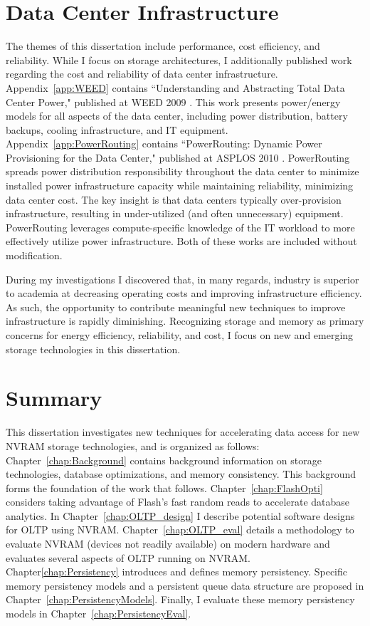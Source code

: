 \section{Data Center Infrastructure}
\label{sec:Intro:Additional}
The themes of this dissertation include performance, cost efficiency, and reliability.
While I focus on storage architectures, I additionally published work regarding the cost and reliability of data center infrastructure.
Appendix~\ref{app:WEED} contains ``Understanding and Abstracting Total Data Center Power," published at WEED 2009 \cite{PelleyMeisner09}.
This work presents power/energy models for all aspects of the data center, including power distribution, battery backups, cooling infrastructure, and IT equipment.
Appendix~\ref{app:PowerRouting} contains ``PowerRouting: Dynamic Power Provisioning for the Data Center," published at ASPLOS 2010 \cite{PelleyMeisner10}.
PowerRouting spreads power distribution responsibility throughout the data center to minimize installed power infrastructure capacity while maintaining reliability, minimizing data center cost.
The key insight is that data centers typically over-provision infrastructure, resulting in under-utilized (and often unnecessary) equipment.
PowerRouting leverages compute-specific knowledge of the IT workload to more effectively utilize power infrastructure.
Both of these works are included without modification.

During my investigations I discovered that, in many regards, industry is superior to academia at decreasing operating costs and improving infrastructure efficiency.
As such, the opportunity to contribute meaningful new techniques to improve infrastructure is rapidly diminishing.
Recognizing storage and memory as primary concerns for energy efficiency, reliability, and cost, I focus on new and emerging storage technologies in this dissertation.

\section{Summary}
\label{sec:Intro:Summary}
This dissertation investigates new techniques for accelerating data access for new NVRAM storage technologies, and is organized as follows:
Chapter~\ref{chap:Background} contains background information on storage technologies, database optimizations, and memory consistency.
This background forms the foundation of the work that follows.
Chapter~\ref{chap:FlashOpti} considers taking advantage of Flash's fast random reads to accelerate database analytics.
In Chapter~\ref{chap:OLTP_design} I describe potential software designs for OLTP using NVRAM.
Chapter~\ref{chap:OLTP_eval} details a methodology to evaluate NVRAM (devices not readily available) on modern hardware and evaluates several aspects of OLTP running on NVRAM.
Chapter\ref{chap:Persistency} introduces and defines memory persistency.
Specific memory persistency models and a persistent queue data structure are proposed in Chapter~\ref{chap:PersistencyModels}.
Finally, I evaluate these memory persistency models in Chapter~\ref{chap:PersistencyEval}.

